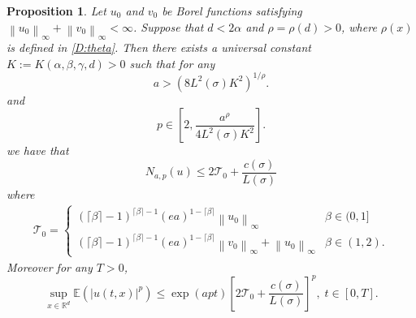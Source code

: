 \documentclass[a4paper,11pt]{article}
\numberwithin{equation}{section}
\theoremstyle{plain}
\newtheorem{proposition}[theorem]{Proposition}
\theoremstyle{definition}
\newcommand{\Norm}[1]{\left\|  #1   \right\|}
\newcommand{\R}{\mathbb{R}}
\numberwithin{NQ}{section}
\numberwithin{LQ}{section}
\numberwithin{ZQ}{section}
\begin{document}
	\begin{proposition}{\normalfont\cite[Proposition 3.2]{SoleMillet2021}}
		\label{P:N(u)Bdd}
		Let $u_0$ and $v_0$ be Borel functions satisfying $\Norm{u_0}_\infty + \Norm{v_0}_\infty < \infty$. Suppose that $d < 2 \alpha$ and $\rho = \rho(d) > 0$, where $\rho(x)$ is defined in \eqref{D:theta}. Then there exists a universal constant $K:=K(\alpha, \beta, \gamma,d) >0$ such that for any 
		\[
		a > \left( 8 L^2(\sigma)K^2\right)^{1/\rho}.
		\]
		and 
		\[
		p \in \left[ 2, \frac{a^{\rho}}{4L^2(\sigma)K^2} \right].
		\]
		we have that 
		\begin{equation}
		\label{E:Nbdd}
		N_{a,p}(u)  \le 2 \mathcal{T}_0 +  \frac{c(\sigma)}{L(\sigma)}
		\end{equation}	
		where
		\begin{align*}
		\mathcal{T}_0 = \begin{cases} 
		(\lceil \beta \rceil - 1)^{\lceil \beta \rceil -1}(ea)^{1-\lceil \beta \rceil} \Norm{u_0}_\infty  & \beta \in (0,1]
		\\ (\lceil \beta \rceil - 1)^{\lceil \beta \rceil -1}(ea)^{1-\lceil \beta \rceil} \Norm{v_0}_\infty + \Norm{u_0}_\infty & \beta \in (1,2).
		\end{cases} 
		\end{align*}
		Moreover for any $T>0$,
		\begin{equation}
		\label{E:Pnormtbdd}
		\sup_{x\in\R^d} \mathbb{E}(|u(t,x)|^p) \le \exp\left( a p t  \right) \left[ 2 \mathcal{T}_0 + \frac{ c(\sigma) }{L(\sigma)} \right]^p, \; t\in[0,T].
		\end{equation}
	\end{proposition}
\end{document}
